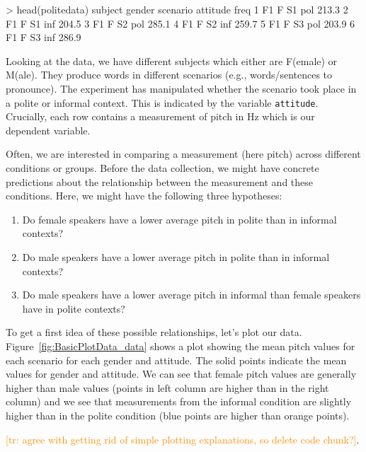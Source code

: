 \documentclass[nobib]{tufte-handout}
\newcommand{\tr}[1]{\textcolor{DarkOrange}{[tr: #1]}}
\begin{document}
\begin{rc}
> head(politedata)
  subject gender scenario attitude  freq
1      F1      F       S1      pol 213.3
2      F1      F       S1      inf 204.5
3      F1      F       S2      pol 285.1
4      F1      F       S2      inf 259.7
5      F1      F       S3      pol 203.9
6      F1      F       S3      inf 286.9
\end{rc}

\medskip

\noindent Looking at the data, we have different subjects which either are F(emale) or M(ale). They produce words in different scenarios (e.g., words/sentences to pronounce). The experiment has manipulated whether the scenario took place in a polite or informal context. This is indicated by the variable \texttt{attitude}. Crucially, each row contains a measurement of pitch in Hz which is our dependent variable. 

Often, we are interested in comparing a measurement (here pitch) across different conditions or groups. Before the data collection, we might have concrete predictions about the relationship between the measurement and these conditions. Here, we might have the following three hypotheses:

\begin{enumerate}[{H}1:]
\item Do female speakers have a lower average pitch in polite than in informal contexts?
\item Do male speakers have a lower average pitch in polite than in informal contexts?
\item Do male speakers have a lower average pitch in informal than female speakers have in polite contexts?
\end{enumerate}

\noindent To get a first idea of these possible relationships, let's plot our data. Figure~\ref{fig:BasicPlotData_data} shows a plot showing the mean pitch values for each scenario for each gender and attitude. The solid points indicate the mean values for gender and attitude. We can see that female pitch values are generally higher than male values (points in left column are higher than in the right column) and we see that measurements from the informal condition are slightly higher than in the polite condition (blue points are higher than orange points). 

\tr{agree with getting rid of simple plotting explanations, so delete code chunk?}. 

\medskip
\end{document}
